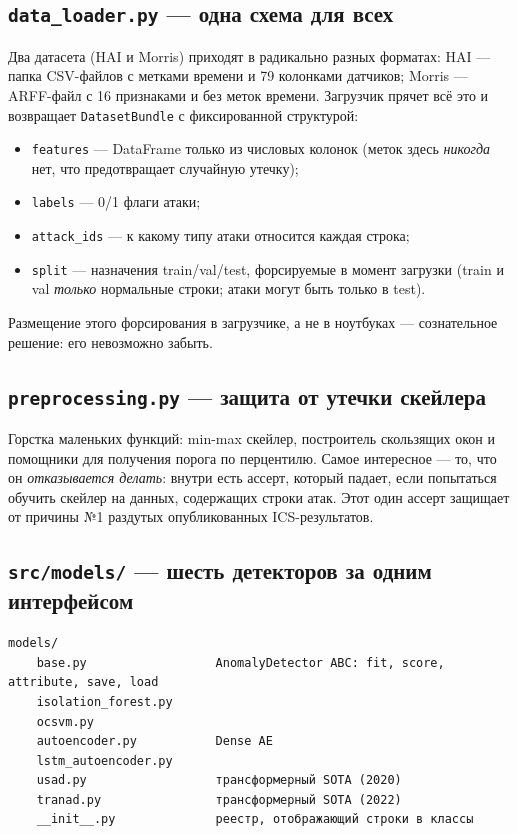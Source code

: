 \documentclass[11pt,a4paper]{article}
\newcommand{\code}[1]{\texttt{#1}}
\begin{document}
\subsection{\texttt{data\_loader.py} --- одна схема для всех}

Два датасета (HAI и Morris) приходят в радикально разных форматах: HAI --- папка CSV-файлов с метками времени и 79 колонками датчиков; Morris --- ARFF-файл с 16 признаками и без меток времени. Загрузчик прячет всё это и возвращает \code{DatasetBundle} с фиксированной структурой:

\begin{itemize}
  \item \code{features} --- DataFrame только из числовых колонок (меток здесь \emph{никогда} нет, что предотвращает случайную утечку);
  \item \code{labels} --- 0/1 флаги атаки;
  \item \code{attack\_ids} --- к какому типу атаки относится каждая строка;
  \item \code{split} --- назначения train/val/test, форсируемые в момент загрузки (train и val \emph{только} нормальные строки; атаки могут быть только в test).
\end{itemize}

Размещение этого форсирования в загрузчике, а не в ноутбуках --- сознательное решение: его невозможно забыть.

\subsection{\texttt{preprocessing.py} --- защита от утечки скейлера}

Горстка маленьких функций: min-max скейлер, построитель скользящих окон и помощники для получения порога по перцентилю. Самое интересное --- то, что он \emph{отказывается делать}: внутри есть ассерт, который падает, если попытаться обучить скейлер на данных, содержащих строки атак. Этот один ассерт защищает от причины №1 раздутых опубликованных ICS-результатов.

\subsection{\texttt{src/models/} --- шесть детекторов за одним интерфейсом}

\begin{Verbatim}
models/
    base.py                  AnomalyDetector ABC: fit, score, attribute, save, load
    isolation_forest.py
    ocsvm.py
    autoencoder.py           Dense AE
    lstm_autoencoder.py
    usad.py                  трансформерный SOTA (2020)
    tranad.py                трансформерный SOTA (2022)
    __init__.py              реестр, отображающий строки в классы
\end{Verbatim}
\end{document}
